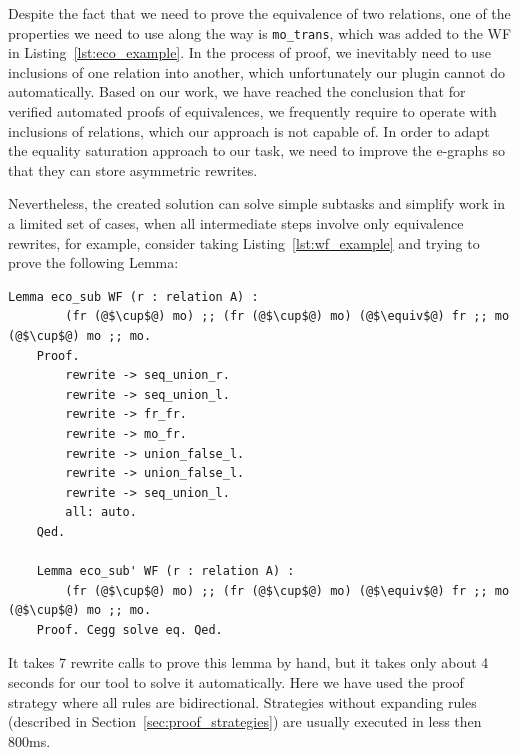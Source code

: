 Despite the fact that we need to prove the equivalence of two relations, one of the properties we need to use along the way is \texttt{mo\_trans}, which was added to the WF in Listing~\ref{lst:eco_example}. In the process of proof, we inevitably need to use inclusions of one relation into another, which unfortunately our plugin cannot do automatically. Based on our work, we have reached the conclusion that for verified automated proofs of equivalences, we frequently require to operate with inclusions of relations, which our approach is not capable of. In order to adapt the equality saturation approach to our task, we need to improve the e-graphs so that they can store asymmetric rewrites.

Nevertheless, the created solution can solve simple subtasks and simplify work in a limited set of cases, when all intermediate steps involve only equivalence rewrites, for example, consider taking Listing~\ref{lst:wf_example} and trying to prove the following Lemma: 

\vspace{0.5cm}
\begin{lstlisting}[language=coq]
    Lemma eco_sub WF (r : relation A) :
        (fr (@$\cup$@) mo) ;; (fr (@$\cup$@) mo) (@$\equiv$@) fr ;; mo (@$\cup$@) mo ;; mo.
    Proof.
        rewrite -> seq_union_r.
        rewrite -> seq_union_l.
        rewrite -> fr_fr.
        rewrite -> mo_fr.
        rewrite -> union_false_l.
        rewrite -> union_false_l.
        rewrite -> seq_union_l.
        all: auto.
    Qed.

    Lemma eco_sub' WF (r : relation A) :
        (fr (@$\cup$@) mo) ;; (fr (@$\cup$@) mo) (@$\equiv$@) fr ;; mo (@$\cup$@) mo ;; mo.
    Proof. Cegg solve eq. Qed. 
\end{lstlisting}

It takes 7 rewrite calls to prove this lemma by hand, but it takes only about 4 seconds for our tool to solve it automatically. Here we have used the proof strategy where all rules are bidirectional. Strategies without expanding rules (described in Section~\ref{sec:proof_strategies}) are usually executed in less then 800ms. 
